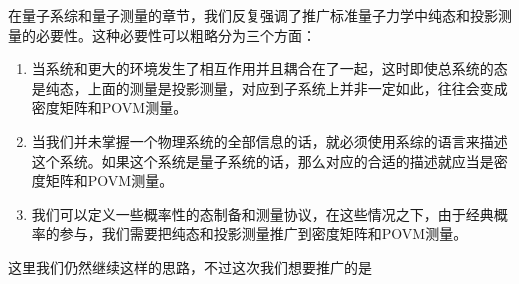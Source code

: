 

在量子系综和量子测量的章节，我们反复强调了推广标准量子力学中纯态和投影测量的必要性。这种必要性可以粗略分为三个方面：
\begin{enumerate}
\item 当系统和更大的环境发生了相互作用并且耦合在了一起，这时即使总系统的态是纯态，上面的测量是投影测量，对应到子系统上并非一定如此，往往会变成密度矩阵和POVM测量。
\item 当我们并未掌握一个物理系统的全部信息的话，就必须使用系综的语言来描述这个系统。如果这个系统是量子系统的话，那么对应的合适的描述就应当是密度矩阵和POVM测量。
\item 我们可以定义一些概率性的态制备和测量协议，在这些情况之下，由于经典概率的参与，我们需要把纯态和投影测量推广到密度矩阵和POVM测量。
\end{enumerate}

这里我们仍然继续这样的思路，不过这次我们想要推广的是